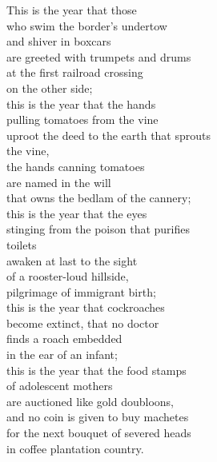 \documentclass[a4paper,12pt,openany]{memoir}
\begin{document}
\begin{multicols}{2}
\noindent
This is the year that those \\
who swim the border's undertow \\
and shiver in boxcars \\
are greeted with trumpets and drums \\
at the first railroad crossing \\
on the other side; \\
this is the year that the hands \\
pulling tomatoes from the vine \\
uproot the deed to the earth that sprouts \\
\vin the vine, \\
the hands canning tomatoes \\
are named in the will \\
that owns the bedlam of the cannery; \\
this is the year that the eyes \\
stinging from the poison that purifies \\ 
\vin toilets \\
awaken at last to the sight \\
of a rooster-loud hillside, \\
pilgrimage of immigrant birth; \\
this is the year that cockroaches \\
become extinct, that no doctor \\
finds a roach embedded \\
in the ear of an infant; \\
this is the year that the food stamps \\
of adolescent mothers \\
are auctioned like gold doubloons, \\
and no coin is given to buy machetes \\
for the next bouquet of severed heads \\
in coffee plantation country. \\
 

\end{multicols}
\end{document}
